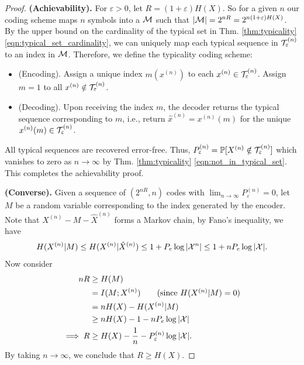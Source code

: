 \documentclass[11pt,a4paper]{article}
\begin{document}
\begin{proof}
    \textbf{(Achievability).} For $\varepsilon > 0$, let $R = (1+\varepsilon)H(X)$.  So for a given $n$ our coding scheme maps $n$ symbols into a $\mathcal{M}$ such that $|\mathcal{M}| = 2^{nR} = 2^{n(1+\varepsilon)H(X)}$. By the upper bound on the cardinality of the typical set in Thm. \ref{thm:typicality} \eqref{eqn:typical_set_cardinality}, we can uniquely map each typical sequence in $\mathcal{T}^{(n)}_\varepsilon$ to an index in $\mathcal{M}$. Therefore, we define the typicality coding scheme:
    \begin{itemize}
        \item {(Encoding).} Assign a unique index $m(x^{(n)})$ to each $x^{(n)}\in\mathcal{T}^{(n)}_\varepsilon$. Assign $m = 1$ to all $x^{(n)}\notin \mathcal{T}^{(n)}_\varepsilon$. 
        \item {(Decoding).} Upon receiving the index $m$, the decoder returns the typical sequence corresponding to $m$, i.e., return $\hat{x}^{(n)} = x^{(n)}(m)$ for the unique $x^{(n)}(m)\in\mathcal{T}^{(n)}_\varepsilon$.
    \end{itemize}

    \noindent All typical sequences are recovered error-free. Thus, $P^{(n)}_\varepsilon = \mathbb{P}[X^{(n)}\notin\mathcal{T}^{(n)}_\varepsilon]$ which vanishes to zero as $n\rightarrow \infty$ by Thm. \ref{thm:typicality} \eqref{eqn:not_in_typical_set}. This completes the achievability proof.

    \noindent \textbf{(Converse).} Given a sequence of $(2^{nR},n)$ codes with $\lim_{n\rightarrow \infty} P^{(n)}_\varepsilon = 0$, let $M$ be a random variable corresponding to the index generated by the encoder. Note that $X^{(n)} - M - \hat{X}^{(n)}$ forms a Markov chain, by Fano's inequality, we have
    \begin{equation*}
        H(X^{(n)}|M) \le H(X^{(n)}|\hat{X}^{(n)}) \le 1 + P_e \log|\mathcal{X}^n|\le 1 + nP_e\log|\mathcal{X}|.
    \end{equation*}
    Now consider 
    \begin{align*}
        nR &\ge H(M) \\
        &= I(M;X^{(n)})\tag{since $H(X^{(n)}|M) = 0$} \\
        &= nH(X) - H(X^{(n)}|M) \\
        &\ge nH(X) - 1 - nP_e\log|\X|\\
        \implies R &\ge H(X) - \dfrac{1}{n} - P^{(n)}_\varepsilon\log|\X|.
    \end{align*}
    By taking $n\rightarrow \infty$, we conclude that $R\ge H(X)$.
\end{proof}
\end{document}
